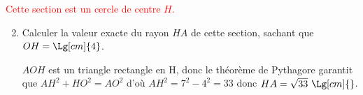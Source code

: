 \begin{corrige}
\begin{enumerate}
        \textcolor{red}{Cette section est un cercle de centre $H$.}
    \end{enumerate}
    \Coupe
    \begin{enumerate}
        \setcounter{enumi}{1}
        \item Calculer la valeur exacte du rayon $HA$ de cette section, sachant que $OH = \Lg[cm]{4}$.
        
        {\color{red} $AOH$ est un triangle rectangle en H, donc le théorème de Pythagore garantit que $AH^2+HO^2=AO^2$ d'où $AH^2=7^2-4^2=33$ donc $HA=\sqrt{33}~\Lg[cm]{}$.}
    \end{enumerate}
\end{corrige}
